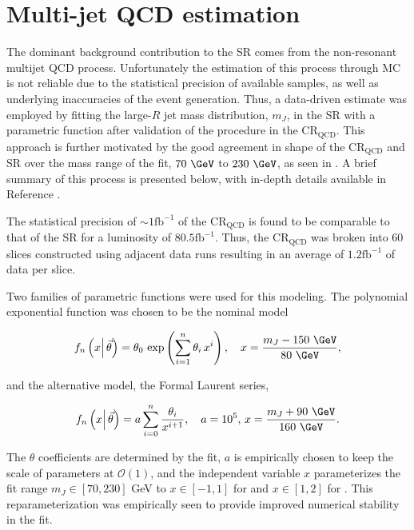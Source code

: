 \section{Multi-jet QCD estimation} \label{sec:background:qcd}

The dominant background contribution to the SR comes from the non-resonant
multijet QCD process. Unfortunately the estimation of this process through MC
is not reliable due to the statistical precision of available samples, as well
as underlying inaccuracies of the event generation.  Thus, a data-driven
estimate was employed by fitting the large-$R$ jet mass distribution, $m_{J}$,
in the SR with a parametric function after validation of the procedure in the
$\text{CR}_{\text{QCD}}$.  This approach is further motivated by the good
agreement in shape of the $\text{CR}_{\text{QCD}}$ and SR over the mass range
of the fit, $70~\GeV$ to $230~\GeV$, as seen in
. A brief summary of this process is presented
below, with in-depth details available in Reference
\cite{Feickert:2690521}.

The statistical precision of $\sim 1 \text{fb}^{-1}$ of the
$\text{CR}_{\text{QCD}}$ is found to be comparable to that of the SR for a
luminosity of $80.5 \text{fb}^{-1}$.  Thus, the $\text{CR}_{\text{QCD}}$ was
broken into 60 slices constructed using adjacent data runs resulting in an
average of $1.2 \text{fb}^{-1}$ of data per slice.

Two families of parametric functions were used for this modeling.  The
polynomial exponential function was chosen to be the nominal model

\begin{equation}
\label{sec:background:polynomial}
f_{n} \left(x \middle|\,\vec{\theta}\right) = \theta_{0}\, \exp\left(\sum_{i=1}^{n} \theta_{i}\,x^{i}\right), \quad x = \frac{m_{J} - 150~\GeV}{80~\GeV},
\end{equation}

and the alternative model, the Formal Laurent series,

\begin{equation}
\label{sec:background:laurent}
f_{n} \left(x \middle|\,\vec{\theta}\right) = a \sum_{i=0}^{n} \frac{\theta_{i}}{x^{i+1}}, \quad a=10^{5},\,x = \frac{m_{J} + 90~\GeV}{160~\GeV}.
\end{equation}

The $\theta$ coefficients are determined by the fit, $a$ is empirically chosen
to keep the scale of parameters at $\mathcal{O}(1)$, and the independent
variable $x$ parameterizes the fit range $m_{J}\in[70,230]$ GeV to $x\in[-1,1]$
for  and $x\in[1,2]$ for
.  This reparameterization was empirically seen to
provide improved numerical stability in the fit.

